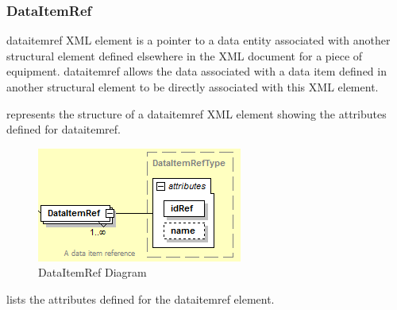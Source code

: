\documentclass{mtconnect}	%
\begin{document}
\subsubsection{DataItemRef}

\gls{dataitemref} XML element is a pointer to a \gls{data entity} associated with another \gls{structural element} defined elsewhere in the XML document for a piece of equipment.  \gls{dataitemref} allows the data associated with a data item defined in another \gls{structural element} to be directly associated with this XML element.

 represents the structure of a \gls{dataitemref} XML element showing the attributes defined for \gls{dataitemref}.

\begin{figure}[ht]
  \centering
  \includegraphics[width=.75\textwidth]{figures/dataitemref-schema-diagram.png}
  \caption{DataItemRef Diagram}
  \label{fig:dataitemref-schema-diagram}
\end{figure}

\FloatBarrier

 lists the attributes defined for the \gls{dataitemref} element. 
\end{document}
